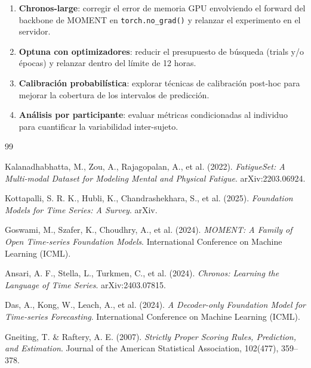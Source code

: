 \documentclass[12pt, a4paper]{article}
\newcommand{\code}[1]{\texttt{#1}}
\begin{document}
\begin{enumerate}
    \item \textbf{Chronos-large}: corregir el error de memoria GPU envolviendo el forward del backbone de MOMENT en \code{torch.no\_grad()} y relanzar el experimento en el servidor.
    \item \textbf{Optuna con optimizadores}: reducir el presupuesto de búsqueda (trials y/o épocas) y relanzar dentro del límite de 12 horas.
    \item \textbf{Calibración probabilística}: explorar técnicas de calibración post-hoc para mejorar la cobertura de los intervalos de predicción.
    \item \textbf{Análisis por participante}: evaluar métricas condicionadas al individuo para cuantificar la variabilidad inter-sujeto.
\end{enumerate}



\begin{thebibliography}{99}

Kalanadhabhatta, M., Zou, A., Rajagopalan, A., et al. (2022).
\textit{FatigueSet: A Multi-modal Dataset for Modeling Mental and Physical Fatigue}.
arXiv:2203.06924.

Kottapalli, S. R. K., Hubli, K., Chandrashekhara, S., et al. (2025).
\textit{Foundation Models for Time Series: A Survey}.
arXiv.

Goswami, M., Szafer, K., Choudhry, A., et al. (2024).
\textit{MOMENT: A Family of Open Time-series Foundation Models}.
International Conference on Machine Learning (ICML).

Ansari, A. F., Stella, L., Turkmen, C., et al. (2024).
\textit{Chronos: Learning the Language of Time Series}.
arXiv:2403.07815.

Das, A., Kong, W., Leach, A., et al. (2024).
\textit{A Decoder-only Foundation Model for Time-series Forecasting}.
International Conference on Machine Learning (ICML).

Gneiting, T. \& Raftery, A. E. (2007).
\textit{Strictly Proper Scoring Rules, Prediction, and Estimation}.
Journal of the American Statistical Association, 102(477), 359--378.

\end{thebibliography}
\end{document}
